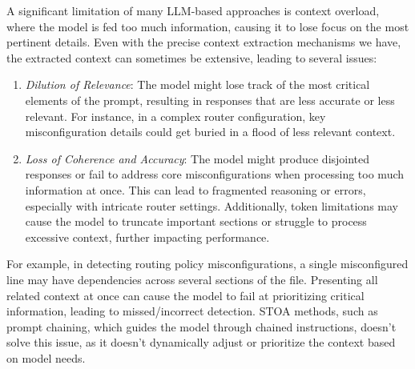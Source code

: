 \label{challenge_3}
A significant limitation of many LLM-based approaches is context overload, where the model is fed too much information, causing it to lose focus on the most pertinent details.
Even with the precise context extraction mechanisms we have, the extracted context can sometimes be extensive,
leading to several issues:

\begin{enumerate}
    \item \textit{Dilution of Relevance}: The model might lose track of the most critical elements of the prompt, resulting in responses that are less accurate or less relevant. For instance, in a complex router configuration, key misconfiguration details could get buried in a flood of less relevant context.
    \item \textit{Loss of Coherence and Accuracy}:
    The model might produce disjointed responses or fail to address core
    misconfigurations when processing too much information at once. This
    can lead to fragmented reasoning or errors, especially with intricate
    router settings. Additionally, token limitations may cause the model
    to truncate important sections or struggle to process excessive context, 
    further impacting performance.
\end{enumerate}

For example, in detecting routing policy misconfigurations, a single misconfigured line may have dependencies across several sections of the file. Presenting all related context at once can cause the model to fail at prioritizing critical information, leading to missed/incorrect detection. STOA methods, such as prompt chaining, which guides the model through chained instructions, doesn't solve this issue, as it doesn't dynamically adjust or prioritize the context based on model needs.